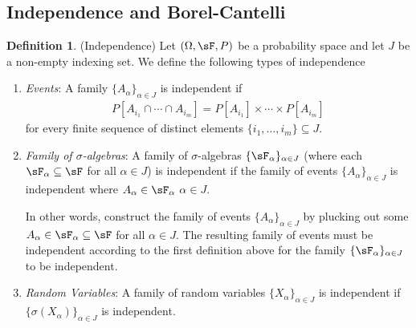 \documentclass[12pt]{article}
\theoremstyle{plain}
\theoremstyle{definition}
\newtheorem{defn}[thm]{Definition}
\theoremstyle{remark}
\begin{document}
\subsection{Independence and Borel-Cantelli}

\begin{defn}(Independence)
Let $(\Omega,\sF,P)$ be a probability space and let $J$ be a non-empty
indexing set. We define the following types of independence
\begin{enumerate}
  \item \emph{Events}: A family $\{A_\alpha\}_{\alpha\in J}$ is
    independent if
    \begin{align*}
      P[A_{i_1} \cap \cdots \cap A_{i_m}]
      = P[A_{i_1}]\times \cdots \times P[A_{i_m}]
    \end{align*}
    for every finite sequence of distinct elements
    $\{i_1,\ldots,i_m\}\subseteq J$.

  \item \emph{Family of $\sigma$-algebras}: A family of
    $\sigma$-algebras $\{\sF_\alpha\}_{\alpha\in J}$
    (where each $\sF_\alpha\subseteq \sF$ for all $\alpha\in J$)
    is independent if the family of events
    $\{A_\alpha\}_{\alpha \in J}$ is independent where
    $A_{\alpha}\in \sF_{\alpha}$ $\alpha\in J$.

    In other words, construct the family of events
    $\{A_\alpha\}_{\alpha \in J}$ by plucking out some
    $A_\alpha \in \sF_\alpha\subseteq \sF$ for all $\alpha \in J$. The
    resulting family of events must be independent according to the
    first definition above for the family
    $\{\sF_\alpha\}_{\alpha \in J}$ to be independent.

  \item \emph{Random Variables}: A family of random variables
    $\{X_\alpha\}_{\alpha\in J}$ is independent if
    $\{\sigma(X_\alpha)\}_{\alpha \in J}$ is independent.
\end{enumerate}
\end{defn}
\end{document}

